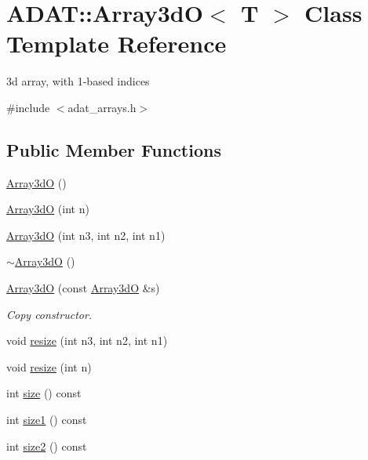 \hypertarget{classADAT_1_1Array3dO}{}\section{A\+D\+AT\+:\+:Array3dO$<$ T $>$ Class Template Reference}
\label{classADAT_1_1Array3dO}


3d array, with 1-\/based indices  




{\ttfamily \#include $<$adat\+\_\+arrays.\+h$>$}

\subsection*{Public Member Functions}
\begin{DoxyCompactItemize}
\item 
\mbox{\hyperlink{classADAT_1_1Array3dO_aaf7d69b08f7c9e5c01a123da7f52b8d1}{Array3dO}} ()
\item 
\mbox{\hyperlink{classADAT_1_1Array3dO_a4546b7e563774cfcdbe0be19cabbb854}{Array3dO}} (int n)
\item 
\mbox{\hyperlink{classADAT_1_1Array3dO_aed93788a8b6356d91260f6a5afa80f9b}{Array3dO}} (int n3, int n2, int n1)
\item 
\mbox{\hyperlink{classADAT_1_1Array3dO_a71c38217f7d5663f7a067733b9040274}{$\sim$\+Array3dO}} ()
\item 
\mbox{\hyperlink{classADAT_1_1Array3dO_aca48914514856bcde242c27bce944040}{Array3dO}} (const \mbox{\hyperlink{classADAT_1_1Array3dO}{Array3dO}} \&s)
\begin{DoxyCompactList}\small\item\em Copy constructor. \end{DoxyCompactList}\item 
void \mbox{\hyperlink{classADAT_1_1Array3dO_ac2ad038aba5cf35770c319cb199cd438}{resize}} (int n3, int n2, int n1)
\item 
void \mbox{\hyperlink{classADAT_1_1Array3dO_ade806f07a366f5217783998dda678b6f}{resize}} (int n)
\item 
int \mbox{\hyperlink{classADAT_1_1Array3dO_a44da6abc6d1597d9df0b983691b952fc}{size}} () const
\item 
int \mbox{\hyperlink{classADAT_1_1Array3dO_a30149908b955c7eeebec86a24e6afffd}{size1}} () const
\item 
int \mbox{\hyperlink{classADAT_1_1Array3dO_ab4a1fc3cfddf9238d7ab3fefac03ad18}{size2}} () const
\item 

\end{DoxyCompactItemize}
